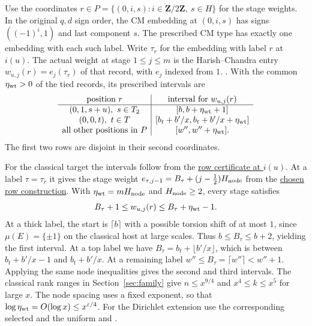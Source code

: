 Use the coordinates \(r\in P=\{(0,i,s):i\in\mathbf Z/2\mathbf Z,\ s\in H\}\)
for the stage weights. In the original \(q,d\) sign order, the CM
embedding at \((0,i,s)\) has signs \(((-1)^i,1)\) and last component
\(s\). The prescribed CM type has exactly one embedding with each
such label. Write \(\tau_r\) for the embedding with label \(r\)
at \(i(u)\). The actual weight at stage \(1\le j\le m\) is the
Harish--Chandra entry \(w_{u,j}(r)=e_j(\tau_r)\) of that record,
with \(e_j\) indexed from \(1\).
.
With the common
\(\eta_{\rm wt}>0\) of the tied records, its prescribed intervals are
\[
\begin{array}{c|c}
 \text{position }r & \text{interval for }w_{u,j}(r)\\ \hline
 (0,1,s+u),\ s\in T_2 & [b,b+\eta_{\rm wt}+1]\\
 (0,0,t),\ t\in T & [b_t+b'/x,b_t+b'/x+\eta_{\rm wt}]\\
 \text{all other positions in }P & [w'',w''+\eta_{\rm wt}].
\end{array}
\]
The first two rows are disjoint in their second coordinates.

\leavevmode{}%
For the classical target the intervals follow from the
\hyperlink{proof.section-run-family-identification}{row certificate at \(i(u)\)}.
At a label \(\tau=\tau_r\) it gives the stage weight
\(e_{\tau,j-1}=B_\tau+(j-\tfrac12)H_{\rm node}\) from the
\hyperlink{proof.section-run-design}{chosen row construction}.
With \(\eta_{\rm wt}=mH_{\rm node}\) and \(H_{\rm node}\ge2\), every
stage satisfies
\[
 B_\tau+1\le w_{u,j}(r)\le B_\tau+\eta_{\rm wt}-1 .
\]
At a thick label, the start is \(\lceil b\rceil\) with a possible
torsion shift of at most \(1\), since
\hyperlink{proof.classical-host-roots-of-unity}{\(\mu(E)=\{\pm1\}\)}
on the classical host at large scales. Thus \(b\le B_\tau\le b+2\),
yielding the first interval. At a top label
we have \(B_\tau=b_t+\lfloor b'/x\rfloor\), which is between
\(b_t+b'/x-1\) and \(b_t+b'/x\). At a remaining label
\(w''\le B_\tau=\lceil w''\rceil<w''+1\). Applying the same
node inequalities gives the second and third intervals.
The classical rank ranges in Section~\ref{sec:family} give
\(n\le x^{9/4}\) and \(x^4\le k\le x^5\) for large \(x\).
The node spacing uses a fixed exponent, so that
\(\log\eta_{\rm wt}=O(\log x)\le x^{\varepsilon/4}\).
For the Dirichlet extension use the corresponding selected
and the uniform
and .

